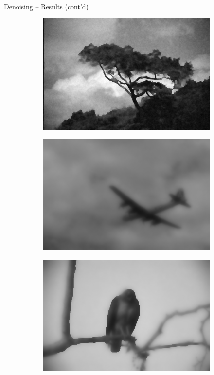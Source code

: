 \documentclass[t]{beamer}
\begin{document}
\begin{frame}{Denoising -- Results (cont'd)}
\begin{figure}[h]
\begin{subfigure}[t]{0.25\textwidth}
			\end{subfigure}
			\begin{subfigure}[t]{0.25\textwidth}
				\includegraphics[scale=0.175]{../paper/pictures/denoising/image/147091_ipiano_absolute.png}
			\end{subfigure}
			\begin{subfigure}[t]{0.25\textwidth}
				\includegraphics[scale=0.175]{../paper/pictures/denoising/image/3096_ipiano_squared.png}
			\end{subfigure}
			\begin{subfigure}[t]{0.25\textwidth}
				\includegraphics[scale=0.175]{../paper/pictures/denoising/image/42049_ipiano_squared.png}

\end{subfigure}
\end{figure}
\end{frame}
\end{document}
